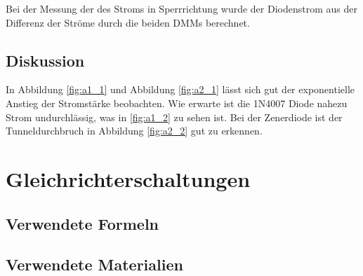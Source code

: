 \documentclass[12pt,a4paper]{article}
\begin{document}
Bei der Messung der des Stroms in Sperrrichtung wurde der Diodenstrom aus der Differenz der Ströme durch die beiden DMMs berechnet.

\subsection{Diskussion}
In Abbildung \ref{fig:a1_1} und Abbildung \ref{fig:a2_1} lässt sich gut der exponentielle Anstieg der Stromstärke beobachten. Wie erwarte ist die 1N4007 Diode nahezu Strom undurchlässig, was in \ref{fig:a1_2} zu sehen ist. Bei der Zenerdiode ist der Tunneldurchbruch in Abbildung \ref{fig:a2_2} gut zu erkennen.

\section{Gleichrichterschaltungen}
\subsection{Verwendete Formeln}
\subsection{Verwendete Materialien}
\end{document}
